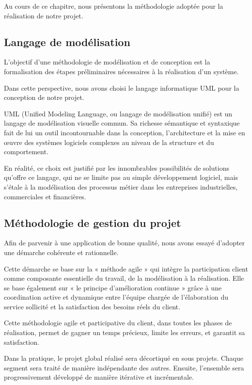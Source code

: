 \documentclass[a4paper,12pt]{report}
\begin{document}
Au cours de ce chapitre, nous présentons la méthodologie adoptée pour la réalisation de notre projet.

\subsection{Langage de modélisation}

L'objectif d'une méthodologie de modélisation et de conception est la formalisation des étapes préliminaires nécessaires à la réalisation d'un système.

Dans cette perspective, nous avons choisi le langage informatique UML pour la conception de notre projet.

UML (Unified Modeling Language, ou langage de modélisation unifié) est un langage de modélisation visuelle commun\cite{uml_omg}. Sa richesse sémantique et syntaxique fait de lui un outil incontournable dans la conception, l'architecture et la mise en œuvre des systèmes logiciels complexes au niveau de la structure et du comportement.

En réalité, ce choix est justifié par les innombrables possibilités de solutions qu'offre ce langage, qui ne se limite pas au simple développement logiciel, mais s'étale à la modélisation des processus métier dans les entreprises industrielles, commerciales et financières.

\subsection{Méthodologie de gestion du projet}

Afin de parvenir à une application de bonne qualité, nous avons essayé d'adopter une démarche cohérente et rationnelle.

Cette démarche se base sur la « méthode agile » qui intègre la participation client comme composante essentielle du travail, de la modélisation à la réalisation. Elle se base également sur « le principe d'amélioration continue » grâce à une coordination active et dynamique entre l'équipe chargée de l'élaboration du service sollicité et la satisfaction des besoins réels du client.

Cette méthodologie agile et participative du client, dans toutes les phases de réalisation, permet de gagner un temps précieux, limite les erreurs, et garantit sa satisfaction.

Dans la pratique, le projet global réalisé sera décortiqué en sous projets. Chaque segment sera traité de manière indépendante des autres. Ensuite, l'ensemble sera progressivement développé de manière itérative et incrémentale.
\end{document}
